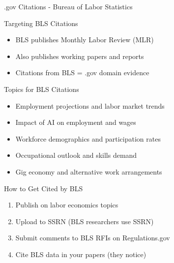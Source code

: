 \documentclass[11pt]{beamer}
\begin{document}
	\begin{frame}{.gov Citations - Bureau of Labor Statistics}
		\scriptsize
		\begin{block}{Targeting BLS Citations}
			\begin{itemize}
				\item BLS publishes Monthly Labor Review (MLR)
				\item Also publishes working papers and reports
				\item Citations from BLS = .gov domain evidence
			\end{itemize}
		\end{block}
		\begin{block}{Topics for BLS Citations}
			\begin{itemize}
				\item Employment projections and labor market trends
				\item Impact of AI on employment and wages
				\item Workforce demographics and participation rates
				\item Occupational outlook and skills demand
				\item Gig economy and alternative work arrangements
			\end{itemize}
		\end{block}
		\begin{block}{How to Get Cited by BLS}
			\begin{enumerate}
				\item Publish on labor economics topics
				\item Upload to SSRN (BLS researchers use SSRN)
				\item Submit comments to BLS RFIs on Regulations.gov
				\item Cite BLS data in your papers (they notice)
			\end{enumerate}
		\end{block}
	\end{frame}
	
\end{document}
